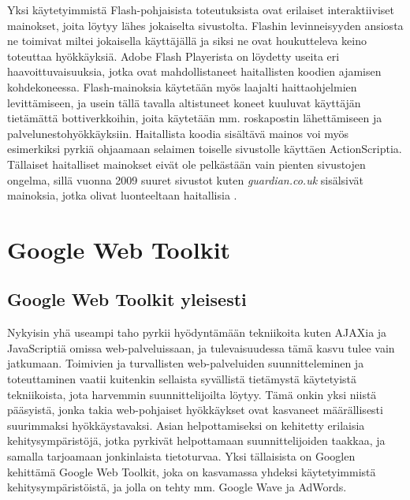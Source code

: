 Yksi käytetyimmistä Flash-pohjaisista toteutuksista ovat erilaiset interaktiiviset mainokset, joita löytyy lähes jokaiselta sivustolta. Flashin levinneisyyden ansiosta ne toimivat miltei
jokaisella käyttäjällä ja siksi ne ovat houkutteleva keino toteuttaa hyökkäyksiä. Adobe Flash Playerista on löydetty useita eri haavoittuvaisuuksia, jotka ovat mahdollistaneet haitallisten
koodien ajamisen kohdekoneessa. Flash-mainoksia käytetään myös laajalti haittaohjelmien levittämiseen, ja usein tällä tavalla altistuneet koneet kuuluvat käyttäjän tietämättä 
bottiverkkoihin, joita käytetään mm. roskapostin lähettämiseen ja palvelunestohyökkäyksiin. Haitallista koodia sisältävä mainos voi myös esimerkiksi pyrkiä ohjaamaan selaimen toiselle 
sivustolle käyttäen ActionScriptia.  Tällaiset haitalliset mainokset eivät ole pelkästään vain pienten sivustojen ongelma, sillä vuonna 2009 suuret sivustot kuten \emph{guardian.co.uk} 
sisälsivät mainoksia, jotka olivat luonteeltaan haitallisia \cite{FlashAdd}.

\section{Google Web Toolkit}

\subsection{Google Web Toolkit yleisesti}

Nykyisin yhä useampi taho pyrkii hyödyntämään tekniikoita kuten AJAXia ja JavaScriptiä omissa web-palveluissaan, ja tulevaisuudessa tämä kasvu tulee vain jatkumaan. Toimivien ja 
turvallisten  web-palveluiden suunnitteleminen ja toteuttaminen vaatii kuitenkin sellaista syvällistä tietämystä käytetyistä tekniikoista, jota harvemmin suunnittelijoilta löytyy. 
Tämä onkin yksi  niistä pääsyistä, jonka takia web-pohjaiset hyökkäykset ovat kasvaneet määrällisesti suurimmaksi hyökkäystavaksi. Asian helpottamiseksi on kehitetty erilaisia 
kehitysympäristöjä, jotka pyrkivät helpottamaan suunnittelijoiden taakkaa, ja samalla tarjoamaan jonkinlaista tietoturvaa. Yksi tällaisista on Googlen kehittämä Google Web Toolkit, 
joka on kasvamassa yhdeksi käytetyimmistä kehitysympäristöistä, ja jolla on tehty mm. Google Wave ja AdWords.

